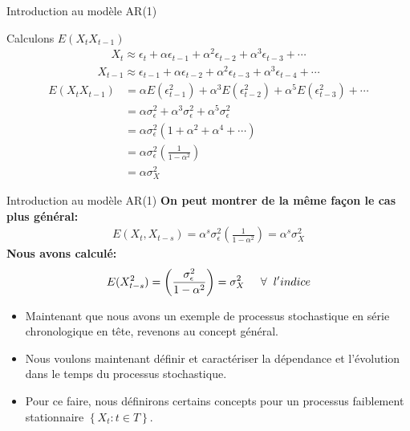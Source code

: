 \documentclass{beamer}
\begin{document}
\begin{frame}{Introduction au modèle AR(1)}
\begin{block}{Calculons $E(X_t X_{t-1})$}
\begin{align*}
X_t \approx \epsilon_t+\alpha \epsilon_{t-1}+\alpha^2 \epsilon_{t-2}+\alpha^3 \epsilon_{t-3}+\cdots
\end{align*}
\begin{align*}
X_{t-1} \approx \epsilon_{t-1}+\alpha \epsilon_{t-2}+\alpha^2 \epsilon_{t-3}+\alpha^3 \epsilon_{t-4}+\cdots
\end{align*}
\begin{align*}
E(X_t X_{t-1}) & =\alpha E(\epsilon_{t-1}^2)+\alpha^3E(\epsilon_{t-2}^2)+\alpha^5E(\epsilon_{t-3}^2)+\cdots \\ & = \alpha \sigma_{\epsilon}^2 +\alpha^3 \sigma_{\epsilon}^2 + \alpha^5 \sigma_{\epsilon}^2 \\ & = \alpha\sigma_{\epsilon}^2 (1+\alpha^2+\alpha^4+\cdots) \\ & = \alpha\sigma_{\epsilon}^2  \left( \frac{1}{1-\alpha^2} \right) \\ & = \alpha \sigma_X^2
\end{align*}
\end{block}
\end{frame}

\begin{frame}{Introduction au modèle AR(1)}
\textbf{On peut montrer de la même façon le cas plus général:}
\begin{align*}
E(X_t,X_{t-s})=\alpha^s\sigma_{\epsilon}^2  \left( \frac{1}{1-\alpha^2} \right)=\alpha^s \sigma_X^2
\end{align*}
\textbf{Nous avons calculé:}
\begin{align*}
E(X_{t-s}^2)=\left( \frac{\sigma_{\epsilon}^2}{1-\alpha^2} \right)=\sigma_X^2 \hspace{0.5cm} \forall \hspace{0.2cm} l'indice
\end{align*}
\begin{itemize}
\item Maintenant que nous avons un exemple de processus stochastique en série chronologique en tête, revenons au concept général.
\item Nous voulons maintenant définir et caractériser la dépendance et l’évolution dans le temps du processus stochastique. 
\item Pour ce faire, nous définirons certains concepts pour un processus faiblement stationnaire $\left\{ X_t : t \in T \right\}$.
\end{itemize}
\end{frame}
\end{document}
